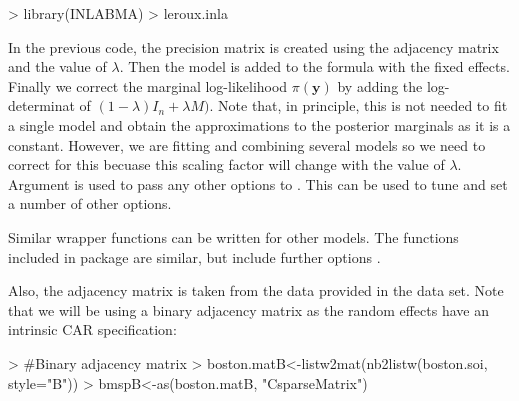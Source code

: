 \documentclass[article]{jss}
\begin{document}
\begin{Schunk}
\begin{Sinput}
> library(INLABMA)
> leroux.inla
\end{Sinput}
\end{Schunk}


In the previous code, the precision matrix is created using the adjacency
matrix and the value of $\lambda$. Then the  model is added to the
formula with the fixed effects. Finally we correct the marginal log-likelihood
$\pi(\mathbf{y})$ by adding the log-determinat of $(1-\lambda)I_n+\lambda M)$.
Note that, in principle, this is not needed to fit a single model and obtain
the approximations to the posterior marginals as it is a constant. However, we
are fitting and combining several models so we need to correct for this
becuase this scaling factor will change with the value of $\lambda$.
Argument  is used to pass any other options to . 
This can be used to tune and set a number of other options.

Similar wrapper functions can be written for other models. The functions
included in package  are similar, but include further options
\citep[see,][for details]{Bivandetal:2013}.



Also, the adjacency matrix is taken from the data provided in the 
data set.
Note that we will be using a binary adjacency matrix as the random
effects have an intrinsic CAR specification:
\begin{Schunk}
\begin{Sinput}
> #Binary adjacency matrix
> boston.matB<-listw2mat(nb2listw(boston.soi, style="B"))
> bmspB<-as(boston.matB, "CsparseMatrix")
\end{Sinput}
\end{Schunk}
\end{document}
